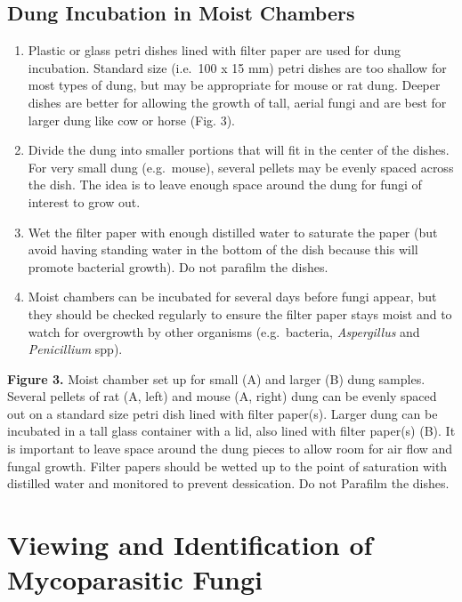\documentclass[]{book}
\providecommand{\tightlist}{%
  \setlength{\itemsep}{0pt}\setlength{\parskip}{0pt}}
\begin{document}
\subsection{Dung Incubation in Moist
Chambers}\label{dung-incubation-in-moist-chambers}

\begin{enumerate}
\def\labelenumi{\arabic{enumi}.}
\tightlist
\item
  Plastic or glass petri dishes lined with filter paper are used for
  dung incubation. Standard size (i.e.~100 x 15 mm) petri dishes are too
  shallow for most types of dung, but may be appropriate for mouse or
  rat dung. Deeper dishes are better for allowing the growth of tall,
  aerial fungi and are best for larger dung like cow or horse (Fig. 3).
\item
  Divide the dung into smaller portions that will fit in the center of
  the dishes. For very small dung (e.g.~mouse), several pellets may be
  evenly spaced across the dish. The idea is to leave enough space
  around the dung for fungi of interest to grow out.
\item
  Wet the filter paper with enough distilled water to saturate the paper
  (but avoid having standing water in the bottom of the dish because
  this will promote bacterial growth). Do not parafilm the dishes.
\item
  Moist chambers can be incubated for several days before fungi appear,
  but they should be checked regularly to ensure the filter paper stays
  moist and to watch for overgrowth by other organisms (e.g.~bacteria,
  \emph{Aspergillus} and \emph{Penicillium} spp).
\end{enumerate}

\textbf{Figure 3.} Moist chamber set up for small (A) and larger (B)
dung samples. Several pellets of rat (A, left) and mouse (A, right) dung
can be evenly spaced out on a standard size petri dish lined with filter
paper(s). Larger dung can be incubated in a tall glass container with a
lid, also lined with filter paper(s) (B). It is important to leave space
around the dung pieces to allow room for air flow and fungal growth.
Filter papers should be wetted up to the point of saturation with
distilled water and monitored to prevent dessication. Do not Parafilm
the dishes.

\section{Viewing and Identification of Mycoparasitic
Fungi}\label{viewing-and-identification-of-mycoparasitic-fungi}
\end{document}
